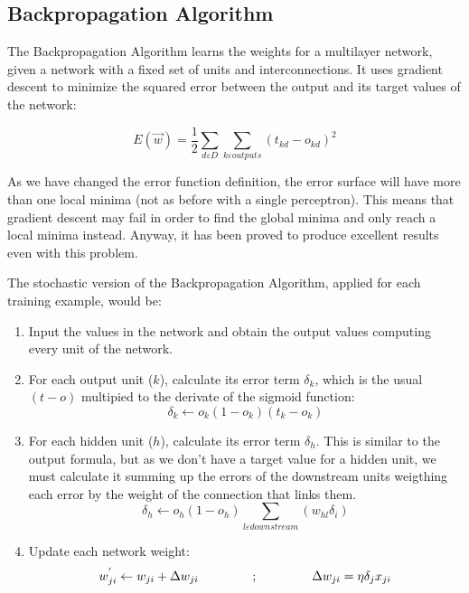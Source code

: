 	\subsection{Backpropagation Algorithm}
	The Backpropagation Algorithm learns the weights for a multilayer  network, given a network with a fixed set of units and interconnections. It uses gradient descent to minimize the squared error between the output and its target values of the network:

		\begin{equation}
			\label{squared_error_function_network}
			E(\vec{w}) = \frac{1}{2} \sum_{d \varepsilon D} \sum_{k \varepsilon outputs} (t_{kd}-o_{kd})^2 
		\end{equation}

	As we have changed the error function definition, the error surface will have more than one local minima (not as before with a single perceptron). This means that gradient descent may fail in order to find the global minima and only reach a local minima instead. Anyway, it has been proved to produce excellent results even with this problem.

	The stochastic version of the Backpropagation Algorithm, applied for each training example, would be:

		\begin{enumerate}

			\item Input the values in the network and obtain the output values computing every unit of the network.
			\item For each output unit ($k$), calculate its error term $\delta_k$, which is the usual $(t-o)$ multipied to the derivate of the sigmoid function:
				\begin{equation}
					\label{backpropagation_output_error}
					\delta_k \leftarrow o_k (1 - o_k)(t_k - o_k)
				\end{equation}				

			\item For each hidden unit ($h$), calculate its error term $\delta_h$. This is similar to the output formula, but as we don't have a target value for a hidden unit, we must calculate it summing up the errors of the downstream units weigthing each error by the weight of the connection that links them. 
				\begin{equation}
					\label{backpropagation_hidden_error}
					\delta_h \leftarrow o_h (1 - o_h) \sum_{l \varepsilon downstream} (w_{hl} \delta_i)
				\end{equation}

			\item Update each network weight:
				\begin{equation}
					\label{backpropagation_weight_update}
					w^{'}_{ji} \leftarrow w_{ji} + \Delta w_{ji} \hspace{1.5cm} ; \hspace{1.5cm} \Delta w_{ji} = \eta \delta_j x_{ji}
				\end{equation}

		\end{enumerate} 


